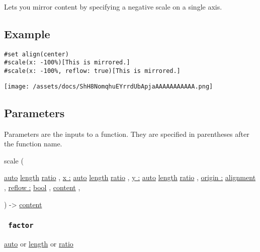 Lets you mirror content by specifying a negative scale on a single axis.

\subsection{Example}\label{example}

\begin{verbatim}
#set align(center)
#scale(x: -100%)[This is mirrored.]
#scale(x: -100%, reflow: true)[This is mirrored.]
\end{verbatim}

\texttt{[image: /assets/docs/ShH8NomqhuEYrrdUbApjaAAAAAAAAAAA.png]}

\subsection{\texorpdfstring{{ Parameters
}}{ Parameters }}\label{parameters}

\label{parameters-tooltip}
Parameters are the inputs to a function. They are specified in
parentheses after the function name.

{ scale } (

{ \hyperref[parameters-factor]{}
\href{/docs/reference/foundations/auto/}{auto}
\href{/docs/reference/layout/length/}{length}
\href{/docs/reference/layout/ratio/}{ratio} , } {
\hyperref[parameters-x]{x :}
\href{/docs/reference/foundations/auto/}{auto}
\href{/docs/reference/layout/length/}{length}
\href{/docs/reference/layout/ratio/}{ratio} , } {
\hyperref[parameters-y]{y :}
\href{/docs/reference/foundations/auto/}{auto}
\href{/docs/reference/layout/length/}{length}
\href{/docs/reference/layout/ratio/}{ratio} , } {
\hyperref[parameters-origin]{origin :}
\href{/docs/reference/layout/alignment/}{alignment} , } {
\hyperref[parameters-reflow]{reflow :}
\href{/docs/reference/foundations/bool/}{bool} , } {
\href{/docs/reference/foundations/content/}{content} , }

) -\textgreater{} \href{/docs/reference/foundations/content/}{content}

\subsubsection{\texorpdfstring{\texttt{\ factor\ }}{ factor }}\label{parameters-factor}

\href{/docs/reference/foundations/auto/}{auto} {or}
\href{/docs/reference/layout/length/}{length} {or}
\href{/docs/reference/layout/ratio/}{ratio}

